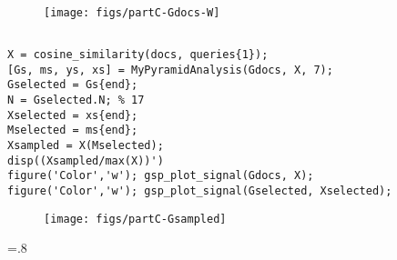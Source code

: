 \begin{figure}[h!]
	\centering
	\texttt{[image: figs/partC-Gdocs-W]}
	\caption{}
	\label{fig:partc-gdocs-w}
\end{figure}\FloatBarrier




\subsection{} %

\begin{latin}
\begin{lstlisting}
X = cosine_similarity(docs, queries{1});
[Gs, ms, ys, xs] = MyPyramidAnalysis(Gdocs, X, 7);
Gselected = Gs{end};
N = Gselected.N; % 17
Xselected = xs{end};
Mselected = ms{end};
Xsampled = X(Mselected);
disp((Xsampled/max(X))') 
figure('Color','w'); gsp_plot_signal(Gdocs, X);
figure('Color','w'); gsp_plot_signal(Gselected, Xselected);
\end{lstlisting}
\end{latin}




\begin{figure}[h!]
	\centering
	\hfill
	\caption{}
\end{figure}\FloatBarrier


\begin{figure}[h!]
	\centering
	\texttt{[image: figs/partC-Gsampled]}
	\caption{}
	\label{fig:partc-gsampled}
\end{figure}\FloatBarrier








\newpage
\begin{latin}
	\baselineskip=.8\baselineskip
	
	
	\nocite{*}
	
\end{latin}

